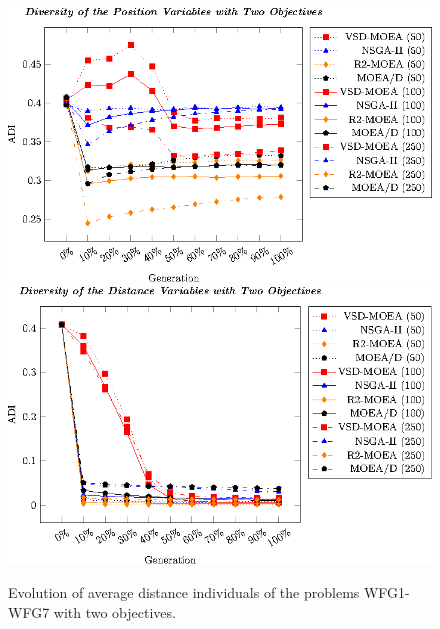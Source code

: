 \begin{figure}[t]
\centering
%
\includegraphics[]{Images/Graphic-Diversity_2obj_tikz-figure0.eps} \\[0.2cm]
\includegraphics[]{Images/Graphic-Diversity_2obj_tikz-figure1.eps}
\caption{Evolution of average distance individuals of the problems WFG1-WFG7 with two objectives.}\label{fig:Diversity_2obj}
\end{figure}



